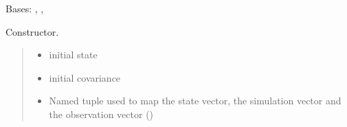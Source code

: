\documentclass[letterpaper,10pt,english]{sphinxmanual}
\begin{document}
\begin{fulllineitems}
\label{\detokenize{GFLocalization:EKF_3DOFDifferentialDriveCtVelocity.EKF_3DOFDifferentialDriveCtVelocity}}
\pysigstartsignatures
{}
\pysigstopsignatures
\sphinxAtStartPar
Bases: {\hyperref[\detokenize{GFLocalization:GFLocalization.GFLocalization}]{}}, {\hyperref[\detokenize{DRLocalization:DR_3DOFDifferentialDrive.DR_3DOFDifferentialDrive}]{}}, {\hyperref[\detokenize{EKF:EKF.EKF}]{}}

\begin{fulllineitems}
\label{\detokenize{GFLocalization:EKF_3DOFDifferentialDriveCtVelocity.EKF_3DOFDifferentialDriveCtVelocity.__init__}}
\pysigstartsignatures
{}
\pysigstopsignatures
\sphinxAtStartPar
Constructor.
\begin{quote}\begin{description}
\begin{itemize}
\item {} 
\sphinxAtStartPar
{} \textendash{} initial state

\item {} 
\sphinxAtStartPar
{} \textendash{} initial covariance

\item {} 
\sphinxAtStartPar
{} \textendash{} Named tuple used to map the state vector, the simulation vector and the observation vector ()


\end{itemize}
\end{description}
\end{quote}
\end{fulllineitems}
\end{fulllineitems}
\end{document}
